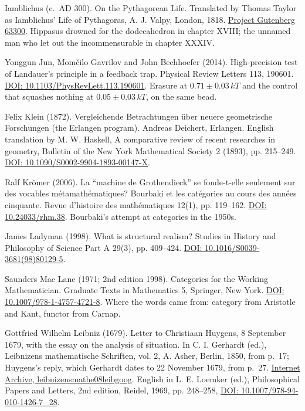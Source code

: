 \documentclass[11pt,twoside]{article}
\theoremstyle{thielethm}
\theoremstyle{thieledef}
\theoremstyle{thieledef}
\theoremstyle{thieledef}
\theoremstyle{thielethm}
\theoremstyle{thieleobs}
\theoremstyle{thielethm}
\begin{document}
\noindent Iamblichus (c.\ AD 300). On the Pythagorean Life. Translated by Thomas Taylor as Iamblichus' Life of Pythagoras, A. J. Valpy, London, 1818. \href{https://www.gutenberg.org/ebooks/63300}{Project Gutenberg 63300}. Hippasus drowned for the dodecahedron in chapter XVIII; the unnamed man who let out the incommensurable in chapter XXXIV.
\par\medskip

\noindent Yonggun Jun, Mom\v{c}ilo Gavrilov and John Bechhoefer (2014). High-precision test of Landauer's principle in a feedback trap. Physical Review Letters 113, 190601. \href{https://doi.org/10.1103/PhysRevLett.113.190601}{DOI: 10.1103/PhysRevLett.113.190601}. Erasure at $0.71 \pm 0.03\,kT$ and the control that squashes nothing at $0.05 \pm 0.03\,kT$, on the same bead.
\par\medskip

\noindent Felix Klein (1872). Vergleichende Betrachtungen \"uber neuere geometrische Forschungen (the Erlangen program). Andreas Deichert, Erlangen. English translation by M. W. Haskell, A comparative review of recent researches in geometry, Bulletin of the New York Mathematical Society 2 (1893), pp. 215--249. \href{https://doi.org/10.1090/S0002-9904-1893-00147-X}{DOI: 10.1090/S0002-9904-1893-00147-X}.
\par\medskip

\noindent Ralf Kr\"omer (2006). La ``machine de Grothendieck'' se fonde-t-elle seulement sur des vocables m\'etamath\'ematiques? Bourbaki et les cat\'egories au cours des ann\'ees cinquante. Revue d'histoire des math\'ematiques 12(1), pp. 119--162. \href{https://doi.org/10.24033/rhm.38}{DOI: 10.24033/rhm.38}. Bourbaki's attempt at categories in the 1950s.
\par\medskip

\noindent James Ladyman (1998). What is structural realism? Studies in History and Philosophy of Science Part A 29(3), pp. 409--424. \href{https://doi.org/10.1016/S0039-3681(98)80129-5}{DOI: 10.1016/S0039-3681(98)80129-5}.
\par\medskip

\noindent Saunders Mac Lane (1971; 2nd edition 1998). Categories for the Working Mathematician. Graduate Texts in Mathematics 5, Springer, New York. \href{https://doi.org/10.1007/978-1-4757-4721-8}{DOI: 10.1007/978-1-4757-4721-8}. Where the words came from: category from Aristotle and Kant, functor from Carnap.
\par\medskip

\noindent Gottfried Wilhelm Leibniz (1679). Letter to Christiaan Huygens, 8 September 1679, with the essay on the analysis of situation. In C. I. Gerhardt (ed.), Leibnizens mathematische Schriften, vol. 2, A. Asher, Berlin, 1850, from p.~17; Huygens's reply, which Gerhardt dates to 22 November 1679, from p.~27. \href{https://archive.org/details/leibnizensmathe08leibgoog}{Internet Archive, leibnizensmathe08leibgoog}. English in L. E. Loemker (ed.), Philosophical Papers and Letters, 2nd edition, Reidel, 1969, pp. 248--258, \href{https://doi.org/10.1007/978-94-010-1426-7_28}{DOI: 10.1007/978-94-010-1426-7\_28}.
\par\medskip
\end{document}
